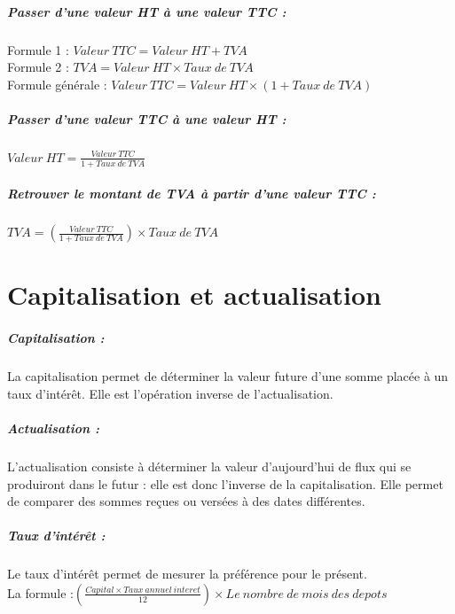 \documentclass{report}
\begin{document}
\newpage

\paragraph*{Passer d'une valeur HT à une valeur TTC :}
Formule 1 : $Valeur\ TTC =  Valeur\ HT + TVA$
\\Formule 2 : $TVA = Valeur\ HT \times Taux\ de\ TVA$
\\Formule générale : $Valeur\ TTC = Valeur\ HT \times  (1 + Taux\ de\ TVA)$

\paragraph*{Passer d'une valeur TTC à une valeur HT :}
$Valeur\ HT = \frac{Valeur\ TTC}{ 1 + Taux\ de\ TVA}$

\paragraph*{Retrouver le montant de TVA à partir d'une valeur TTC :}
$TVA = (\frac{Valeur\ TTC}{1 + Taux\ de\ TVA}) \times Taux\ de\ TVA$

\chapter{Capitalisation et actualisation}

\paragraph*{Capitalisation :} La capitalisation permet de déterminer la valeur future d'une somme placée à un taux d'intérêt. Elle est l'opération inverse de l'actualisation.

\paragraph*{Actualisation :} L'actualisation consiste à déterminer la valeur d'aujourd'hui de flux qui se produiront dans le futur : elle est donc l'inverse de la capitalisation. Elle permet de comparer des sommes reçues ou versées à des dates différentes.

\paragraph*{Taux d'intérêt :} Le taux d'intérêt permet de mesurer la préférence pour le présent.
\\ La formule :{\Large $(\frac {Capital \times Taux\ annuel\ interet}{12}) \times Le\ nombre\ de\ mois\ des\ depots$}
\end{document}
